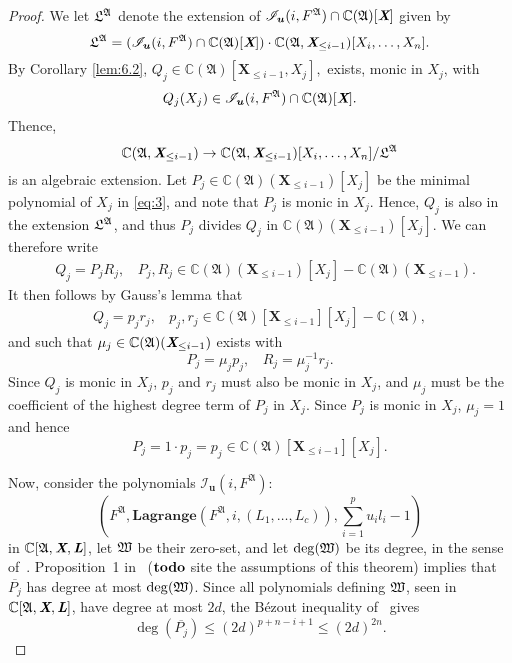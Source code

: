 \documentclass[a4paper]{article}
\def\A{\mathfrak{A}}
\def\Lb{\textit{\textbf{L}}}
\def\Xb{\textit{\textbf{X}}}
\def\ub{{\bm u}}
\def\pjb{\overline{P_{j}}}
\def\C{\mathbb{C}}
\def\lagFfA{{\bm{Lagrange}}(F^{\A},i,(L_1,\hdots,L_c))}
\def\IilfA{\mathscr{I}_{\ub}(i,F^{\A})}
\def\udl{\sum_{i=1}^pu_il_i}
\def\td{{\bf todo}}
\begin{document}
\begin{proof}
     We let $\frak L^\A$ denote the extension of $\IilfA \cap \C(\A)[\Xb]$ given by 
  \[
  \frak
  L^\A =(\IilfA \cap \C(\A)[\Xb])\cdot \C(\frak A, \Xb_{\leq i-1})[X_i,\dots,X_n].
  \]
  By Corollary \ref{lem:6.2}, $Q_j\in\C(\A)[\textbf{X}_{\leq i-1},X_j],$ exists, monic in $X_j$, with 
    \[
    Q_j(X_j) \in \IilfA \cap \C(\A)[\Xb].
    \]
  Thence,
  \begin{equation}\label{eq:3}
    \C(\frak A, \Xb_{\leq i-1}) \to \C(\frak A,
    \Xb_{\leq i-1})[X_i,\dots,X_n]/\frak L^\A
  \end{equation}
    is an algebraic extension. Let $P_j \in \C(\A)(\textbf{X}_{\leq i-1})[X_j]$ 
be the minimal polynomial of $X_j$ in \eqref{eq:3}, and note that $P_j$ is monic in $X_j.$ 
    Hence, $Q_j$ is also in the extension $\frak{L}^\A$, and thus $P_j$ divides $Q_j$ in $\C(\A)(\textbf{X}_{\leq i-1})[X_j].$ We can therefore write 
    \begin{align*}
    &Q_j = P_jR_j,~~~~ P_j,R_j \in \C(\A)(\textbf{X}_{\leq i-1})[X_j]-\C(\A)(\textbf{X}_{\leq i-1}).
    \end{align*}
    It then follows by Gauss's lemma that 
    \begin{align*}
    Q_j = p_jr_j, ~~~~p_j,r_j \in \C(\A)[\textbf{X}_{\leq i-1}][X_j]-\C(\A),
    \end{align*}
    and such that $\mu_j \in \C(\A)(\Xb_{\leq i-1})$ exists with 
    \[
    P_j = \mu_j p_j,~~~~ R_j = \mu_j^{-1}r_j.
    \]
    Since $Q_j$ is monic in $X_j$, $p_j$ and $r_j$ must also be monic in $X_j$, and $\mu_j$ must be the coefficient of the highest degree term of $P_j$ in $X_j.$ Since $P_j$ is monic in $X_j$, $\mu_j =1$ and hence \[P_j=1\cdot p_j=p_j \in \C(\A)[\textbf{X}_{\leq i-1}][X_j].\]

  Now, consider the polynomials $\IilfA:$
\[
 \left(F^{\A}, \lagFfA,\udl-1 \right)
\]
in $\C[\A,\Xb,\Lb]$, let $\frak W$ be their zero-set, and let $\deg(\frak W)$ be its
  degree, in the sense of~\cite{H}. Proposition~1 in~\cite{CGR} ($\td$ site the assumptions of this theorem)
  implies that $\pjb$ has degree at most $\deg(\frak W)$. Since all
  polynomials defining $\frak W$, seen in $\C[\A,\Xb,\Lb]$, have
  degree at most $2d$, the B\'ezout inequality of~\cite{H} gives
  \[\deg(\pjb) \le (2d)^{p+n-i+1} \le (2d)^{2n}.\]
\end{proof}





\end{document}
